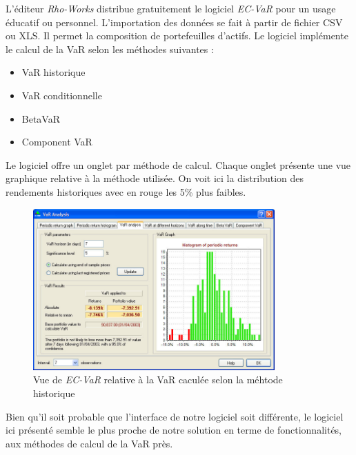 		L'éditeur \textit{Rho-Works} distribue gratuitement le logiciel \textit{EC-VaR} pour un usage éducatif ou personnel. L'importation des données se fait à partir de fichier CSV ou XLS. Il permet la composition de portefeuilles d'actifs. Le logiciel implémente le calcul de la VaR selon les méthodes suivantes :
		\begin{itemize}
			\item VaR historique
			\item VaR conditionnelle
			\item BetaVaR
			\item Component VaR %
		\end{itemize}
		\nocite{website:Rho-Works}

		Le logiciel offre un onglet par méthode de calcul. Chaque onglet présente une vue graphique relative à la méthode utilisée. On voit ici la distribution des rendements historiques avec en rouge les 5\% plus faibles.

		\begin{figure}[h]
			\center
			\includegraphics[width=350px]{ecvar_1b.jpg}
			\caption{Vue de \textit{EC-VaR} relative à la VaR caculée selon la méhtode historique}
			\label{ajustement_garch}
		\end{figure}

		Bien qu'il soit probable que l'interface de notre logiciel soit différente, le logiciel ici présenté semble le plus proche de notre solution en terme de fonctionnalités, aux méthodes de calcul de la VaR près. %

